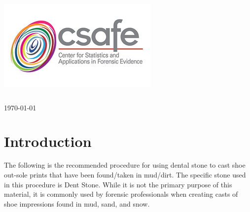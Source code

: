 \begin{titlepage}

\includegraphics[scale=.5]{Logo}\\[1cm]

\begin{center}
\begin{tabular}{ c   |   c } 
 
\end{tabular}
\end{center}

{\large \today}\\[2cm] %


 

\vfill %

\end{titlepage}
 
\tableofcontents

\newpage

\section{Introduction}

The following is the recommended procedure for using dental stone to cast shoe out-sole prints that have been found/taken in mud/dirt. The specific stone used in this procedure is Dent Stone. While it is not the primary purpose of this material, it is commonly used by forensic professionals when creating casts of shoe impressions found in mud, sand, and snow. 

